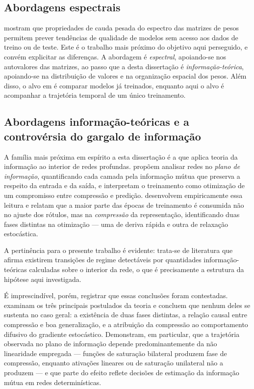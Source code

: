 \subsection{Abordagens espectrais}
\label{sec:ea-espectral}

 mostram que propriedades de cauda pesada do espectro das
matrizes de pesos permitem prever tendências de qualidade de modelos sem acesso
aos dados de treino ou de teste. Este é o trabalho mais próximo do objetivo aqui
perseguido, e convém explicitar as diferenças. A abordagem é \emph{espectral},
apoiando-se nos autovalores das matrizes, ao passo que a desta dissertação é
\emph{informação-teórica}, apoiando-se na distribuição de valores e na
organização espacial dos pesos. Além disso, o alvo em  é
comparar modelos já treinados, enquanto aqui o alvo é acompanhar a trajetória
temporal de um único treinamento.

\subsection{Abordagens informação-teóricas e a controvérsia do gargalo de informação}
\label{sec:ea-info}

A família mais próxima em espírito a esta dissertação é a que aplica teoria da
informação ao interior de redes profundas.  propõem
analisar redes no \emph{plano de informação}, quantificando cada camada pela
informação mútua que preserva a respeito da entrada e da saída, e interpretam o
treinamento como otimização de um compromisso entre compressão e predição.
 desenvolvem empiricamente essa leitura e relatam
que a maior parte das épocas de treinamento é consumida não no ajuste dos
rótulos, mas na \emph{compressão} da representação, identificando duas fases
distintas na otimização --- uma de deriva rápida e outra de relaxação
estocástica.

A pertinência para o presente trabalho é evidente: trata-se de literatura que
afirma existirem transições de regime detectáveis por quantidades
informação-teóricas calculadas sobre o interior da rede, o que é precisamente a
estrutura da hipótese aqui investigada.

É imprescindível, porém, registrar que essas conclusões foram contestadas.
 examinam os três principais postulados da teoria e
concluem que nenhum deles se sustenta no caso geral: a existência de duas fases
distintas, a relação causal entre compressão e boa generalização, e a atribuição
da compressão ao comportamento difusivo do gradiente estocástico. Demonstram, em
particular, que a trajetória observada no plano de informação depende
predominantemente da não linearidade empregada --- funções de saturação bilateral
produzem fase de compressão, enquanto ativações lineares ou de saturação
unilateral não a produzem --- e que parte do efeito reflete decisões de estimação
da informação mútua em redes determinísticas.

